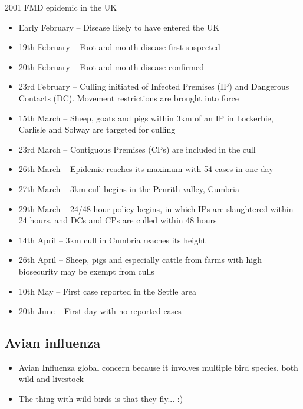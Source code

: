 \documentclass[aspectratio=43]{beamer}
\begin{document}
\begin{frame}{2001 FMD epidemic in the UK}
	\footnotesize
	\begin{itemize}
		\item Early February -- Disease likely to have entered the UK
		\item 19th February -- Foot-and-mouth disease first suspected
		\item 20th February -- Foot-and-mouth disease confirmed
		\item 23rd February -- Culling initiated of Infected Premises  (IP) and Dangerous Contacts (DC). Movement restrictions are brought into force
		\item 15th March -- Sheep, goats and pigs within 3km of an IP in Lockerbie, Carlisle and Solway are targeted for culling
		\item 23rd March -- Contiguous Premises (CPs) are included in the cull
		\item 26th March -- Epidemic reaches its maximum with 54 cases in one day
		\item 27th March -- 3km cull begins in the Penrith valley, Cumbria
		\item 29th March -- 24/48 hour policy begins, in which IPs are slaughtered within 24 hours, and DCs and CPs are culled within 48 hours
		\item 14th April -- 3km cull in Cumbria reaches its height
		\item 26th April -- Sheep, pigs and especially cattle from farms with high biosecurity may be exempt from culls
		\item 10th May -- First case reported in the Settle area
		\item 20th June -- First day with no reported cases
	\end{itemize}
\end{frame}


\subsection{Avian influenza}
\begin{frame}
	\begin{itemize}
		\item Avian Influenza global concern because it involves multiple bird species, both wild and livestock
		\vfill
		\item The thing with wild birds is that they fly... :)
	\end{itemize}
\end{frame}
\end{document}
